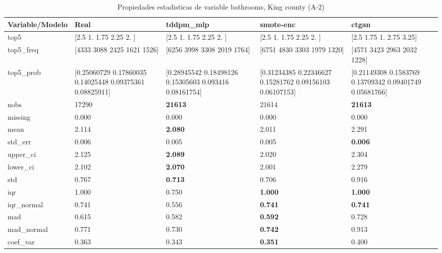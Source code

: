 \begin{table}[H]
\centering
\fontsize{8}{14}\selectfont
\caption{Propiedades  estadisticas de variable bathrooms, King county (A-2)}
\label{table-stats-king county-a-2-bathrooms}
\begin{tabular}{|l|m{10em}|m{10em}|m{10em}|m{10em}|}
\hline
 \rowcolor[gray]{0.8}
Variable/Modelo & Real & tddpm\_mlp & smote-enc & ctgan \\
\hline top5 & [2.5  1.   1.75 2.25 2.  ] & [2.5  1.   1.75 2.25 2.  ] & [2.5  1.   1.75 2.25 2.  ] & [2.5  1.75 1.   2.75 3.25] \\
\hline top5\_freq & [4333 3088 2425 1621 1526] & [6256 3998 3308 2019 1764] & [6751 4830 3303 1979 1320] & [4571 3423 2963 2032 1228] \\
\hline top5\_prob & [0.25060729 0.17860035 0.14025448 0.09375361 0.08825911] & [0.28945542 0.18498126 0.15305603 0.093416   0.08161754] & [0.31234385 0.22346627 0.15281762 0.09156103 0.06107153] & [0.21149308 0.1583769  0.13709342 0.09401749 0.05681766] \\
\hline nobs & 17290 & \bfseries 21613 & \cellcolor[rgb]{0.9, 0.54, 0.52} 21614 & \bfseries 21613 \\
\hline missing & 0.000 & 0.000 & 0.000 & 0.000 \\
\hline mean & 2.114 & \bfseries 2.080 & 2.011 & \cellcolor[rgb]{0.9, 0.54, 0.52} 2.291 \\
\hline std\_err & 0.006 & 0.005 & \cellcolor[rgb]{0.9, 0.54, 0.52} 0.005 & \bfseries 0.006 \\
\hline upper\_ci & 2.125 & \bfseries 2.089 & 2.020 & \cellcolor[rgb]{0.9, 0.54, 0.52} 2.304 \\
\hline lower\_ci & 2.102 & \bfseries 2.070 & 2.001 & \cellcolor[rgb]{0.9, 0.54, 0.52} 2.279 \\
\hline std & 0.767 & \bfseries 0.713 & 0.706 & \cellcolor[rgb]{0.9, 0.54, 0.52} 0.916 \\
\hline iqr & 1.000 & \cellcolor[rgb]{0.9, 0.54, 0.52} 0.750 & \bfseries 1.000 & \bfseries 1.000 \\
\hline iqr\_normal & 0.741 & \cellcolor[rgb]{0.9, 0.54, 0.52} 0.556 & \bfseries 0.741 & \bfseries 0.741 \\
\hline mad & 0.615 & 0.582 & \bfseries 0.592 & \cellcolor[rgb]{0.9, 0.54, 0.52} 0.728 \\
\hline mad\_normal & 0.771 & 0.730 & \bfseries 0.742 & \cellcolor[rgb]{0.9, 0.54, 0.52} 0.913 \\
\hline coef\_var & 0.363 & 0.343 & \bfseries 0.351 & \cellcolor[rgb]{0.9, 0.54, 0.52} 0.400 \\

\end{tabular}
\end{table}
